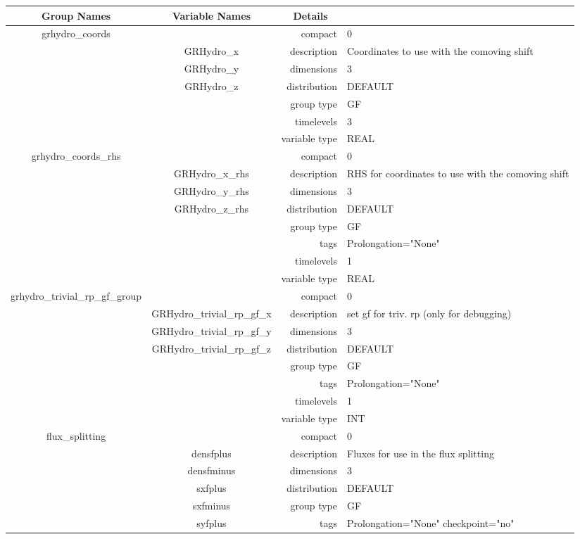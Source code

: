 \begin{tabular*}{150mm}{|c|c@{\extracolsep{\fill}}|rl|} \hline 
~ {\bf Group Names} ~ & ~ {\bf Variable Names} ~  &{\bf Details} ~ & ~ \\ 
\hline 
grhydro\_coords &  & compact & 0 \\ 
 & GRHydro\_x & description & Coordinates to use with the comoving shift \\ 
 & GRHydro\_y & dimensions & 3 \\ 
 & GRHydro\_z & distribution & DEFAULT \\ 
 &  & group type & GF \\ 
 &  & timelevels & 3 \\ 
 &  & variable type & REAL \\ 
\hline 
grhydro\_coords\_rhs &  & compact & 0 \\ 
 & GRHydro\_x\_rhs & description & RHS for coordinates to use with the comoving shift \\ 
 & GRHydro\_y\_rhs & dimensions & 3 \\ 
 & GRHydro\_z\_rhs & distribution & DEFAULT \\ 
 &  & group type & GF \\ 
 &  & tags & Prolongation="None" \\ 
 &  & timelevels & 1 \\ 
 &  & variable type & REAL \\ 
\hline 
grhydro\_trivial\_rp\_gf\_group &  & compact & 0 \\ 
 & GRHydro\_trivial\_rp\_gf\_x & description & set gf for triv. rp (only for debugging) \\ 
 & GRHydro\_trivial\_rp\_gf\_y & dimensions & 3 \\ 
 & GRHydro\_trivial\_rp\_gf\_z & distribution & DEFAULT \\ 
 &  & group type & GF \\ 
 &  & tags & Prolongation="None" \\ 
 &  & timelevels & 1 \\ 
 &  & variable type & INT \\ 
\hline 
flux\_splitting &  & compact & 0 \\ 
 & densfplus & description & Fluxes for use in the flux splitting \\ 
 & densfminus & dimensions & 3 \\ 
 & sxfplus & distribution & DEFAULT \\ 
 & sxfminus & group type & GF \\ 
 & syfplus & tags & Prolongation="None" checkpoint="no" \\ 

\end{tabular*}
